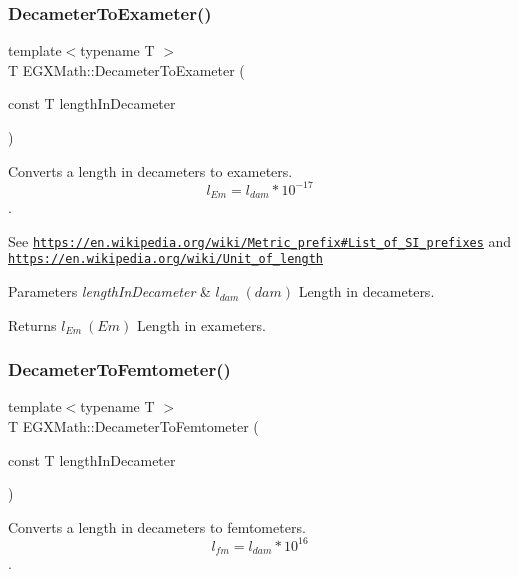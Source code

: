 \subsubsection{\texorpdfstring{Decameter\+To\+Exameter()}{DecameterToExameter()}}
{\footnotesize\ttfamily template$<$typename T $>$ \\
T E\+G\+X\+Math\+::\+Decameter\+To\+Exameter (\begin{DoxyParamCaption}\item[{const T}]{length\+In\+Decameter }\end{DoxyParamCaption})}



Converts a length in decameters to exameters. \[ l_{Em}=l_{dam} * 10^{-17} \]. 

See \href{https://en.wikipedia.org/wiki/Metric_prefix#List_of_SI_prefixes}{\tt https\+://en.\+wikipedia.\+org/wiki/\+Metric\+\_\+prefix\#\+List\+\_\+of\+\_\+\+S\+I\+\_\+prefixes} and \href{https://en.wikipedia.org/wiki/Unit_of_length}{\tt https\+://en.\+wikipedia.\+org/wiki/\+Unit\+\_\+of\+\_\+length} 
\begin{DoxyParams}{Parameters}
{\em length\+In\+Decameter} & $ l_{dam}\ (dam)$ Length in decameters. \\
\hline
\end{DoxyParams}
\begin{DoxyReturn}{Returns}
$ l_{Em}\ (Em)$ Length in exameters. 
\end{DoxyReturn}
\mbox{\label{group___e_g_x_math-_conversions-_length_conversions-_decameter-_s_i_gae42b64853340c10623d206afbc6a9ff4}} 
\subsubsection{\texorpdfstring{Decameter\+To\+Femtometer()}{DecameterToFemtometer()}}
{\footnotesize\ttfamily template$<$typename T $>$ \\
T E\+G\+X\+Math\+::\+Decameter\+To\+Femtometer (\begin{DoxyParamCaption}\item[{const T}]{length\+In\+Decameter }\end{DoxyParamCaption})}



Converts a length in decameters to femtometers. \[ l_{fm}=l_{dam} * 10^{16} \]. 

